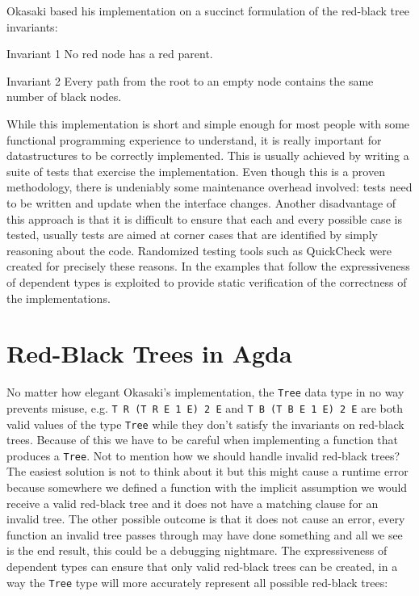 \documentclass[journal, retainorgcmds]{../IEEEtemplate/IEEEtran}
\newcommand{\iagda}[1]{\texttt{#1}}
\newcommand{\ihask}[1]{\texttt{#1}}
\begin{document}
Okasaki based his implementation on a succinct formulation of the red-black tree
invariants:
\begin{LaTeXdescription}
  \item[Invariant 1] No red node has a red parent.
  \item[Invariant 2] Every path from the root to an empty node contains the
                     same number of black nodes.
\end{LaTeXdescription}
While this implementation is short and simple enough for most people with some
functional programming experience to understand, it is really important for
datastructures to be correctly implemented.
This is usually achieved by writing a suite of tests that exercise the
implementation.
Even though this is a proven methodology, there is undeniably some maintenance
overhead involved: tests need to be written and update when the interface
changes.
Another disadvantage of this approach is that it is difficult to ensure that
each and every possible case is tested, usually tests are aimed at corner cases
that are identified by simply reasoning about the code.
Randomized testing tools such as QuickCheck \cite{quickcheck} were created for
precisely these reasons.
In the examples that follow the expressiveness of dependent types is exploited
to provide static verification of the correctness of the implementations.


\section{Red-Black Trees in Agda}

No matter how elegant Okasaki's implementation, the \ihask{Tree} data type
in no way prevents misuse, e.g. \ihask{T R (T R E 1 E) 2 E} and
\ihask{T B (T B E 1 E) 2 E} are both valid values of the type \ihask{Tree}
while they don't satisfy the invariants on red-black trees.
Because of this we have to be careful when implementing a function that
produces a \ihask{Tree}.
Not to mention how we should handle invalid red-black trees?
The easiest solution is not to think about it but this might cause a runtime
error because somewhere we defined a function with the implicit assumption we
would receive a valid red-black tree and it does not have a matching clause for
an invalid tree.
The other possible outcome is that it does not cause an error, every function
an invalid tree passes through may have done something and all we see is the
end result, this could be a debugging nightmare.
The expressiveness of dependent types can ensure that only valid red-black
trees can be created, in a way the \iagda{Tree} type will more accurately
represent all possible red-black trees:
\end{document}
